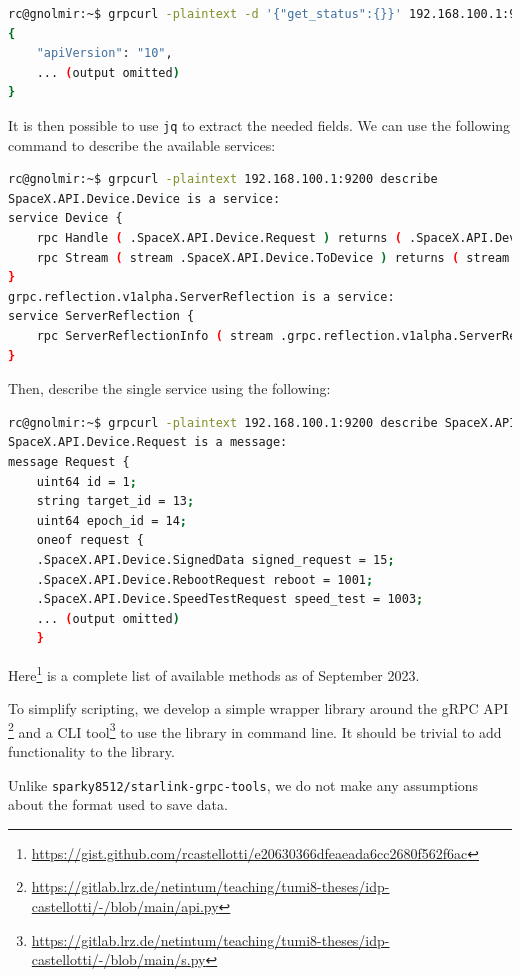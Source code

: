 \documentclass[]{report}
\begin{document}
\begin{lstlisting}[language=bash]
rc@gnolmir:~$ grpcurl -plaintext -d '{"get_status":{}}' 192.168.100.1:9200 SpaceX.API.Device.Device/Handle
{
    "apiVersion": "10",
    ... (output omitted)
}
\end{lstlisting}

It is then possible to use \texttt{jq} to extract the needed fields. We can use the following command to describe the
available services:
    
\begin{lstlisting}[language=bash]
rc@gnolmir:~$ grpcurl -plaintext 192.168.100.1:9200 describe
SpaceX.API.Device.Device is a service:
service Device {
    rpc Handle ( .SpaceX.API.Device.Request ) returns ( .SpaceX.API.Device.Response );
    rpc Stream ( stream .SpaceX.API.Device.ToDevice ) returns ( stream .SpaceX.API.Device.FromDevice );
}
grpc.reflection.v1alpha.ServerReflection is a service:
service ServerReflection {
    rpc ServerReflectionInfo ( stream .grpc.reflection.v1alpha.ServerReflectionRequest ) returns ( stream .grpc.reflection.v1alpha.ServerReflectionResponse );
}
\end{lstlisting}
    
Then, describe the single service using the following:
    
\begin{lstlisting}[language=bash]
rc@gnolmir:~$ grpcurl -plaintext 192.168.100.1:9200 describe SpaceX.API.Device.Request
SpaceX.API.Device.Request is a message:
message Request {
    uint64 id = 1;
    string target_id = 13;
    uint64 epoch_id = 14;
    oneof request {
    .SpaceX.API.Device.SignedData signed_request = 15;
    .SpaceX.API.Device.RebootRequest reboot = 1001;
    .SpaceX.API.Device.SpeedTestRequest speed_test = 1003;
    ... (output omitted)
    }
\end{lstlisting}
    
Here\footnote{\url{https://gist.github.com/rcastellotti/e20630366dfeaeada6cc2680f562f6ac}} is a complete list of
available methods as of September 2023.

To simplify scripting, we develop a simple wrapper library around the gRPC API
\footnote{\url{https://gitlab.lrz.de/netintum/teaching/tumi8-theses/idp-castellotti/-/blob/main/api.py}} and a CLI
tool\footnote{\url{https://gitlab.lrz.de/netintum/teaching/tumi8-theses/idp-castellotti/-/blob/main/s.py}} to use the
library in command line. It should be trivial to add functionality to the library.

Unlike \texttt{sparky8512/starlink-grpc-tools}, we do not make any assumptions about the format used to save data.
\end{document}
